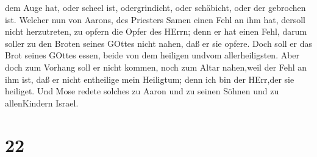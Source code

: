 dem Auge hat, oder scheel ist, odergrindicht, oder schäbicht, oder der
gebrochen ist.  Welcher nun von Aarons, des Priesters Samen
einen Fehl an ihm hat, dersoll nicht herzutreten, zu opfern die Opfer
des HErrn; denn er hat einen Fehl, darum soller zu den Broten seines
GOttes nicht nahen, daß er sie opfere.  Doch soll er das
Brot seines GOttes essen, beide von dem heiligen undvom allerheiligsten.
 Aber doch zum Vorhang soll er nicht kommen, noch zum Altar
nahen,weil der Fehl an ihm ist, daß er nicht entheilige mein Heiligtum;
denn ich bin der HErr,der sie heiliget.  Und Mose redete
solches zu Aaron und zu seinen Söhnen und zu allenKindern Israel.

\hypertarget{section-21}{%
\section{22}\label{section-21}}

